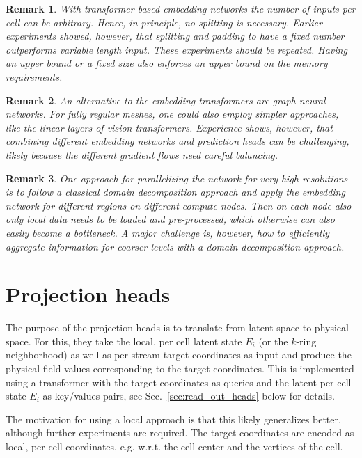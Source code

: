 \documentclass{article}
\newtheorem{remark}{Remark}
\begin{document}
\begin{remark}
  With transformer-based embedding networks the number of inputs per cell can be arbitrary. Hence, in principle, no splitting is necessary. 
  Earlier experiments showed, however, that splitting and padding to have a fixed number outperforms variable length input. 
  These experiments should be repeated.
  Having an upper bound or a fixed size also enforces an upper bound on the memory requirements.	
\end{remark}

\begin{remark}
An alternative to the embedding transformers are graph neural networks. 
For fully regular meshes, one could also employ simpler approaches, like the linear layers of vision transformers.
Experience shows, however, that combining different embedding networks and prediction heads can be challenging, likely because the different gradient flows need careful balancing.
\end{remark}

\begin{remark}
One approach for parallelizing the network for very high resolutions is to follow a classical domain decomposition approach and apply the embedding network for different regions on different compute nodes. 
Then on each node also only local data needs to be loaded and pre-processed, which otherwise can also easily become a bottleneck.
A major challenge is, however, how to efficiently aggregate information for coarser levels with a domain decomposition approach.
\end{remark}

\section{Projection heads}

The purpose of the projection heads is to translate from latent space to physical space. 
For this, they take the local, per cell latent state $E_i$ (or the $k$-ring neighborhood) as well as per stream target coordinates as input and produce the physical field values corresponding to the target coordinates. 
This is implemented using a transformer with the target coordinates as queries and the latent per cell state $E_i$ as key/values pairs, see Sec.~\ref{sec:read_out_heads} below for details.

The motivation for using a local approach is that this likely generalizes better, although further experiments are required. 
The target coordinates are encoded as local, per cell coordinates, e.g. w.r.t. the cell center and the vertices of the cell.
\end{document}
